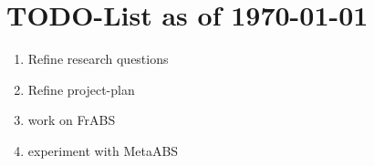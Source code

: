 \section{TODO-List as of \today}

\begin{enumerate}
	\item Refine research questions
	\item Refine project-plan 
	\item work on FrABS
	\item experiment with MetaABS
\end{enumerate}